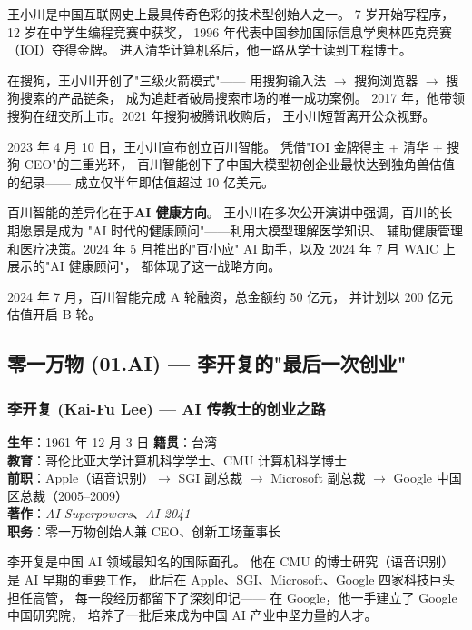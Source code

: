 王小川是中国互联网史上最具传奇色彩的技术型创始人之一。
7 岁开始写程序，12 岁在中学生编程竞赛中获奖，
1996 年代表中国参加国际信息学奥林匹克竞赛（IOI）夺得金牌。
进入清华计算机系后，他一路从学士读到工程博士。

在搜狗，王小川开创了"三级火箭模式"——
用搜狗输入法 $\to$ 搜狗浏览器 $\to$ 搜狗搜索的产品链条，
成为追赶者破局搜索市场的唯一成功案例。
2017 年，他带领搜狗在纽交所上市。2021 年搜狗被腾讯收购后，
王小川短暂离开公众视野。

2023 年 4 月 10 日，王小川宣布创立百川智能。
凭借"IOI 金牌得主 + 清华 + 搜狗 CEO"的三重光环，
百川智能创下了中国大模型初创企业最快达到独角兽估值的纪录——
成立仅半年即估值超过 10 亿美元。

百川智能的差异化在于\textbf{AI 健康方向}。
王小川在多次公开演讲中强调，百川的长期愿景是成为
"AI 时代的健康顾问"——利用大模型理解医学知识、
辅助健康管理和医疗决策。2024 年 5 月推出的"百小应"
AI 助手，以及 2024 年 7 月 WAIC 上展示的"AI 健康顾问"，
都体现了这一战略方向。

2024 年 7 月，百川智能完成 A 轮融资，总金额约 50 亿元，
并计划以 200 亿元估值开启 B 轮。


\subsection{零一万物 (01.AI) — 李开复的"最后一次创业"}

\subsubsection{李开复 (Kai-Fu Lee) — AI 传教士的创业之路}

\begin{keybox}
\textbf{生年}：1961 年 12 月 3 日 \quad \textbf{籍贯}：台湾 \\
\textbf{教育}：哥伦比亚大学计算机科学学士、CMU 计算机科学博士 \\
\textbf{前职}：Apple（语音识别）$\to$ SGI 副总裁 $\to$ Microsoft 副总裁 $\to$ Google 中国区总裁（2005--2009） \\
\textbf{著作}：\textit{AI Superpowers}、\textit{AI 2041} \\
\textbf{职务}：零一万物创始人兼 CEO、创新工场董事长
\end{keybox}

李开复是中国 AI 领域最知名的国际面孔。
他在 CMU 的博士研究（语音识别）是 AI 早期的重要工作，
此后在 Apple、SGI、Microsoft、Google 四家科技巨头担任高管，
每一段经历都留下了深刻印记——
在 Google，他一手建立了 Google 中国研究院，
培养了一批后来成为中国 AI 产业中坚力量的人才。

